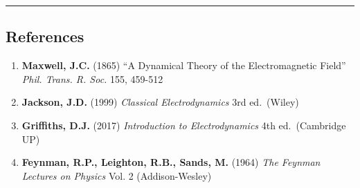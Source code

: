 \begin{center}\rule{0.5\linewidth}{0.5pt}\end{center}

\subsection{\texorpdfstring{ References}{ References}}\label{references}

\begin{enumerate}
\def\labelenumi{\arabic{enumi}.}
\tightlist
\item
  \textbf{Maxwell, J.C.} (1865) ``A Dynamical Theory of the
  Electromagnetic Field'' \emph{Phil. Trans. R. Soc.} 155, 459-512
\item
  \textbf{Jackson, J.D.} (1999) \emph{Classical Electrodynamics} 3rd
  ed.~(Wiley)
\item
  \textbf{Griffiths, D.J.} (2017) \emph{Introduction to Electrodynamics}
  4th ed.~(Cambridge UP)
\item
  \textbf{Feynman, R.P., Leighton, R.B., Sands, M.} (1964) \emph{The
  Feynman Lectures on Physics} Vol. 2 (Addison-Wesley)
\end{enumerate}
